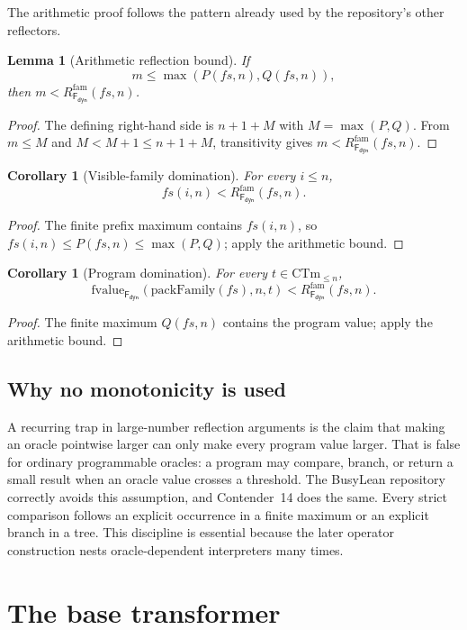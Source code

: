 \documentclass[11pt]{article}
\newtheorem{lemma}[theorem]{Lemma}
\newtheorem{corollary}[theorem]{Corollary}
\theoremstyle{definition}
\theoremstyle{remark}
\newcommand{\Fd}{\mathsf{F}_{\mathsf{dyn}}}
\newcommand{\Rfam}{R_{\Fd}^{\mathrm{fam}}}
\begin{document}
The arithmetic proof follows the pattern already used by the repository's
other reflectors.

\begin{lemma}[Arithmetic reflection bound]
If
\[
m\le\max(P(fs,n),Q(fs,n)),
\]
then $m<\Rfam(fs,n)$.
\end{lemma}

\begin{proof}
The defining right-hand side is $n+1+M$ with $M=\max(P,Q)$.  From $m\le M$ and
$M<M+1\le n+1+M$, transitivity gives $m<\Rfam(fs,n)$.
\end{proof}

\begin{corollary}[Visible-family domination]
For every $i\le n$,
\[
fs(i,n)<\Rfam(fs,n).
\]
\end{corollary}

\begin{proof}
The finite prefix maximum contains $fs(i,n)$, so
$fs(i,n)\le P(fs,n)\le\max(P,Q)$; apply the arithmetic bound.
\end{proof}

\begin{corollary}[Program domination]
For every $t\in\mathrm{CTm}_{\le n}$,
\[
\mathrm{fvalue}_{\Fd}(\mathrm{packFamily}(fs),n,t)<\Rfam(fs,n).
\]
\end{corollary}

\begin{proof}
The finite maximum $Q(fs,n)$ contains the program value; apply the arithmetic
bound.
\end{proof}

\subsection{Why no monotonicity is used}

A recurring trap in large-number reflection arguments is the claim that making
an oracle pointwise larger can only make every program value larger.  That is
false for ordinary programmable oracles: a program may compare, branch, or
return a small result when an oracle value crosses a threshold.  The BusyLean
repository correctly avoids this assumption, and Contender~14 does the same.
Every strict comparison follows an explicit occurrence in a finite maximum or
an explicit branch in a tree.  This discipline is essential because the later
operator construction nests oracle-dependent interpreters many times.

\section{The base transformer}
\end{document}
